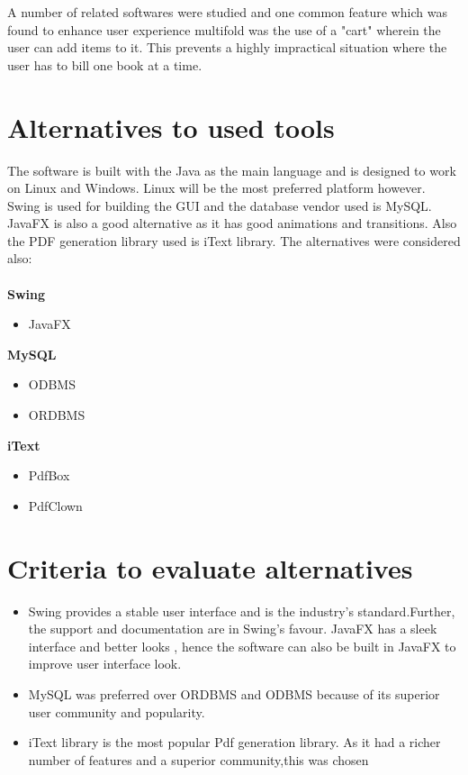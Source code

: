 \documentclass{scrreprt}
\begin{document}
A number of related softwares were studied and one common feature which was found to enhance user experience multifold was the use of a "cart" wherein the user can add items to it. This prevents a highly impractical situation where the user has to bill one book at a time.

\section{Alternatives to used tools}

The software is built with the Java as the main language and is designed to work on Linux and Windows. Linux will be the most preferred platform however. Swing is used for building the GUI and the database vendor used is MySQL. JavaFX is also a good alternative as it has good animations and transitions. Also the PDF generation library used is iText library. The alternatives were considered also: \\ \\
\textbf{Swing}
\begin{itemize}
\item JavaFX 
\end{itemize} 
\textbf{MySQL}
\begin{itemize}
\item ODBMS 
\item ORDBMS
\end{itemize}



\textbf{iText}
\begin{itemize}
\item PdfBox
\item PdfClown
\end{itemize} 



\section{Criteria to evaluate alternatives}
\begin{itemize}
\item 
 Swing provides a stable user interface and is the industry's standard.Further, the support and documentation are in Swing's favour. JavaFX has a sleek interface and better looks , hence the software can also 
 be built in JavaFX to improve user interface look.
\item MySQL was preferred over ORDBMS and ODBMS because of its superior user community and popularity.
\item iText library is the most popular Pdf generation library. As it had a richer number of features and a superior community,this was chosen
\end{itemize}
\end{document}

